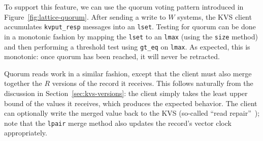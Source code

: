 To support this feature, we can use the \lang quorum voting pattern
introduced in Figure~\ref{fig:lattice-quorum}. After sending a write to $W$
systems, the KVS client accumulates \texttt{kvput\_resp} messages into an
\texttt{lset}. Testing for quorum can be done in a monotonic fashion by mapping
the \texttt{lset} to an \texttt{lmax} (using the \texttt{size} method) and then
performing a threshold test using \texttt{gt\_eq} on \texttt{lmax}. As expected,
this is monotonic: once quorum has been reached, it will never be retracted.

Quorum reads work in a similar fashion, except that the client must also merge
together the $R$ versions of the record it receives. This follows naturally from
the discussion in Section~\ref{sec:kvs-versions}: the client simply takes the
least upper bound of the values it receives, which produces the expected
behavior. The client can optionally write the merged value back to the KVS
(so-called ``read repair''~\cite{DeCandia2007}); note that the \texttt{lpair}
merge method also updates the record's vector clock appropriately.